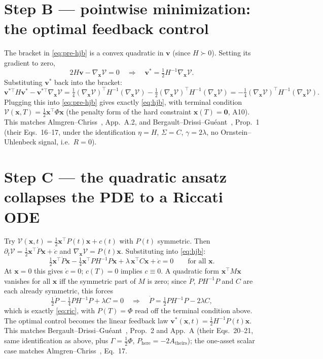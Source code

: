 \documentclass[11pt,a4paper]{article}
\begin{document}
\section*{Step B --- pointwise minimization: the optimal feedback control}

The bracket in \eqref{eq:pre-hjb} is a convex quadratic in $\mathbf v$ (since
$H\succ0$). Setting its gradient to zero,
\[
2H\mathbf v-\nabla_{\mathbf x}\mathcal V=0\quad\Longrightarrow\quad
\mathbf v^*=\tfrac12H^{-1}\nabla_{\mathbf x}\mathcal V.
\]
Substituting $\mathbf v^*$ back into the bracket:
\[
\mathbf v^{*\top}H\mathbf v^*-\mathbf v^{*\top}\nabla_{\mathbf x}\mathcal V
=\tfrac14(\nabla_{\mathbf x}\mathcal V)^\top H^{-1}(\nabla_{\mathbf x}\mathcal
V)-\tfrac12(\nabla_{\mathbf x}\mathcal V)^\top H^{-1}(\nabla_{\mathbf x}
\mathcal V)=-\tfrac14(\nabla_{\mathbf x}\mathcal V)^\top
H^{-1}(\nabla_{\mathbf x}\mathcal V).
\]
Plugging this into \eqref{eq:pre-hjb} gives exactly \eqref{eq:hjb}, with
terminal condition $\mathcal V(\mathbf x,T)=\tfrac12\mathbf x^\top\Phi\mathbf
x$ (the penalty form of the hard constraint $\mathbf x(T)=\mathbf 0$, A10).
This matches Almgren--Chriss~\cite{almgrenchriss2000}, App.~A.2, and
Bergault--Drissi--Gu\'eant~\cite{bergault2022}, Prop.~1 (their Eqs.~16--17,
under the identification $\eta=H$, $\Sigma=C$, $\gamma=2\lambda$, no
Ornstein--Uhlenbeck signal, i.e.\ $R=0$).

\section*{Step C --- the quadratic ansatz collapses the PDE to a Riccati ODE}

Try $\mathcal V(\mathbf x,t)=\tfrac12\mathbf x^\top P(t)\mathbf x+c(t)$ with
$P(t)$ symmetric. Then $\partial_t\mathcal V=\tfrac12\mathbf x^\top\dot
P\mathbf x+\dot c$ and $\nabla_{\mathbf x}\mathcal V=P(t)\mathbf x$. Substituting
into \eqref{eq:hjb}:
\[
\tfrac12\mathbf x^\top\dot P\mathbf x-\tfrac14\mathbf x^\top PH^{-1}P\mathbf
x+\lambda\,\mathbf x^\top C\mathbf x+\dot c=0\qquad\text{for all }\mathbf x.
\]
At $\mathbf x=0$ this gives $\dot c=0$; $c(T)=0$ implies $c\equiv0$.
A quadratic form $\mathbf x^\top M\mathbf x$ vanishes for all $\mathbf x$ iff
the symmetric part of $M$ is zero; since $\dot P$, $PH^{-1}P$ and $C$ are
each already symmetric, this forces
\[
\tfrac12\dot P-\tfrac14PH^{-1}P+\lambda C=0\quad\Longrightarrow\quad
\dot P=\tfrac12PH^{-1}P-2\lambda C,
\]
which is exactly \eqref{eq:ric}, with $P(T)=\Phi$ read off the terminal
condition above. The optimal control becomes the linear feedback law
$\mathbf v^*(\mathbf x,t)=\tfrac12H^{-1}P(t)\mathbf x$. This matches
Bergault--Drissi--Gu\'eant~\cite{bergault2022}, Prop.~2 and App.~A
(their Eqs.~20--21, same identification as above, plus $\Gamma=\tfrac12\Phi$,
$P_{\text{here}}=-2A_{\text{theirs}}$); the one-asset scalar case matches
Almgren--Chriss~\cite{almgrenchriss2000}, Eq.~17.
\end{document}
